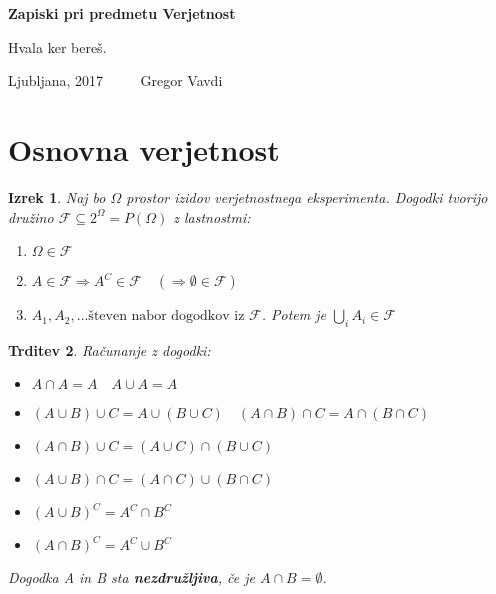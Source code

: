 \documentclass[11pt]{article}
\newtheorem{Izrek}{{\sc Izrek}}[section]
\newtheorem{Trditev}[Izrek]{{\sc Trditev}}
\begin{document}
	
	\thispagestyle{empty}
	\begin{center}
		\begin{Large}
			{\bf Zapiski pri predmetu Verjetnost}
		\end{Large}
		
	\end{center}
	Hvala ker bereš.
	\vfill
	\begin{center}
		Ljubljana, 2017 $\quad \quad $ Gregor Vavdi
	\end{center}
	\newpage
	\setcounter{page}{1}
	
	\section{Osnovna verjetnost}

	\begin{Izrek}
		Naj bo $\Omega$ prostor izidov verjetnostnega eksperimenta. Dogodki tvorijo družino $\mathcal{F} \subseteq 2^\Omega = P(\Omega)$ z lastnostmi:
		\begin{enumerate}
			\item
			$\Omega \in \mathcal{F}$
			\item
			$ A \in \mathcal{F} \Rightarrow A^C \in \mathcal{F} \quad (\Rightarrow \emptyset \in \mathcal{F})$
			\item
			$A_1, A_2,\dots \text{števen nabor dogodkov iz } \mathcal{F}$. Potem je $\bigcup_{i} A_i \in \mathcal{F}$
		\end{enumerate}
	\end{Izrek}
	
	\begin{Trditev}
		Računanje z dogodki:
		\begin{itemize}
			\item
			$A\cap A = A \quad A\cup A = A$
			\item
			$(A\cup B)\cup C = A\cup (B \cup C) \quad (A\cap B) \cap C = A \cap (B\cap C)$
			\item
			$(A\cap B)\cup C = (A \cup C ) \cap (B\cup C)$ 
			\item
			$(A\cup B)\cap C = (A \cap C ) \cup (B\cap C)$ 
			\item
			$(A \cup B)^C = A^C \cap B^C$
			\item
			$(A\cap B) ^C = A^C \cup B^C$
		\end{itemize}
		
		Dogodka A in B sta \textbf{nezdružljiva}, če je $A \cap B = \emptyset$.
	\end{Trditev}
\end{document}
